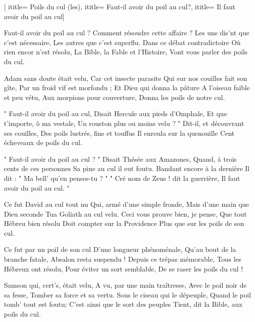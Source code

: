  [
ititle= {Poils du cul (les)},
ititle= {Faut-il avoir du poil au cul?},
ititle= {Il faut avoir du poil au cul}]


\beginverse
Faut-il avoir du poil au cul ?
Comment résoudre cette affaire ?
Les uns dis'nt que c'est nécessaire,
Les autres que c'est superflu.
Dans ce débat contradictoire
Où rien encor n'est résolu,
La Bible, la Fable et l'Histoire,
Vont vous parler des poils du cul.
\endverse

\beginverse
Adam sans doute était velu,
Car cet insecte parasite
Qui sur nos couilles fait son gîte,
Par un froid vif est morfondu ;
Et Dieu qui donna la pâture
A l'oiseau faible et peu vétu,
Aux morpions pour couverture,
Donna les poils de notre cul.
\endverse

\beginverse
" Faut-il avoir du poil au cul,
Disait Hercule aux pieds d'Omphale,
Et que t'importe, ô ma vestale,
Un rouston plus ou moins velu ? "
Dit-il, et découvrant ses couilles,
Des poils lustrés, fins et touffus
Il enroula sur la quenouille
Cent écheveaux de poils du cul.
\endverse

\beginverse
" Faut-il avoir du poil au cul ? "
Disait Thésée aux Amazones,
Quand, à trois cents de ces personnes
Sa pine au cul il eut foutu.
Bandant encore à la dernière
Il dit : " Ma bell' qu'en penses-tu ? "
" Cré nom de Zeus ! dit la guerrière,
Il faut avoir du poil au cul. "
\endverse

\beginverse
Ce fut David au cul tout nu
Qui, armé d'une simple fronde,
Mais d'une main que Dieu seconde
Tua Goliath au cul velu.
Ceci vous prouve bien, je pense,
Que tout Hébreu bien résolu
Doit compter sur la Providence
Plus que sur les poils de son cul.
\endverse

\beginverse
Ce fut par un poil de son cul
D'une longueur phénoménale,
Qu'au bout de la branche fatale,
Absalon resta suspendu !
Depuis ce trépas mémorable,
Tous les Hébreux ont résolu,
Pour éviter un sort semblable,
De se raser les poils du cul !
\endverse

\beginverse
Samson qui, cert's, était velu,
A vu, par une main traîtresse,
Avec le poil noir de sa fesse,
Tomber sa force et sa vertu.
Sous le ciseau qui le dépeuple,
Quand le poil tomb' tout est foutu;
C'est ainsi que le sort des peuples
Tient, dit la Bible, aux poils du cul.
\endverse

